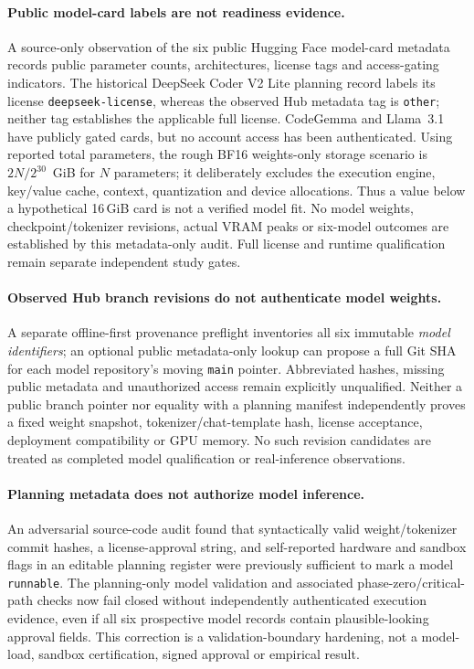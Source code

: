 \documentclass[pdflatex,sn-basic]{sn-jnl}
\begin{document}
\paragraph{Public model-card labels are not readiness evidence.}
A source-only observation of the six public Hugging Face
model-card metadata records public parameter counts,
architectures, license tags and access-gating indicators.
The historical DeepSeek Coder V2 Lite planning record
labels its license \texttt{deepseek-license}, whereas
the observed Hub metadata tag is \texttt{other};
neither tag establishes the applicable full license.
CodeGemma and Llama~3.1 have publicly gated cards,
but no account access has been authenticated.
Using reported total parameters, the rough BF16
weights-only storage scenario is
$2N/2^{30}$~GiB for $N$ parameters; it deliberately
excludes the execution engine, key/value cache, context,
quantization and device allocations. Thus a value below
a hypothetical 16\,GiB card is not a verified model fit.
No model weights, checkpoint/tokenizer revisions,
actual VRAM peaks or six-model outcomes are established
by this metadata-only audit. Full license and runtime
qualification remain separate independent study gates.

\paragraph{Observed Hub branch revisions do not authenticate model weights.}
A separate offline-first provenance preflight inventories all
six immutable \emph{model identifiers}; an optional public
metadata-only lookup can propose a full Git SHA for each
model repository's moving \texttt{main} pointer.
Abbreviated hashes, missing public metadata and unauthorized
access remain explicitly unqualified. Neither a public branch
pointer nor equality with a planning manifest independently
proves a fixed weight snapshot, tokenizer/chat-template hash,
license acceptance, deployment compatibility or GPU memory.
No such revision candidates are treated as completed model
qualification or real-inference observations.

\paragraph{Planning metadata does not authorize model inference.}
An adversarial source-code audit found that syntactically valid
weight/tokenizer commit hashes, a license-approval string,
and self-reported hardware and sandbox flags in an editable
planning register were previously sufficient to mark a
model \texttt{runnable}. The planning-only model validation
and associated phase-zero/critical-path checks now
fail closed without independently authenticated execution
evidence, even if all six prospective model records contain
plausible-looking approval fields. This correction is
a validation-boundary hardening, not a model-load,
sandbox certification, signed approval or empirical result.
\end{document}
